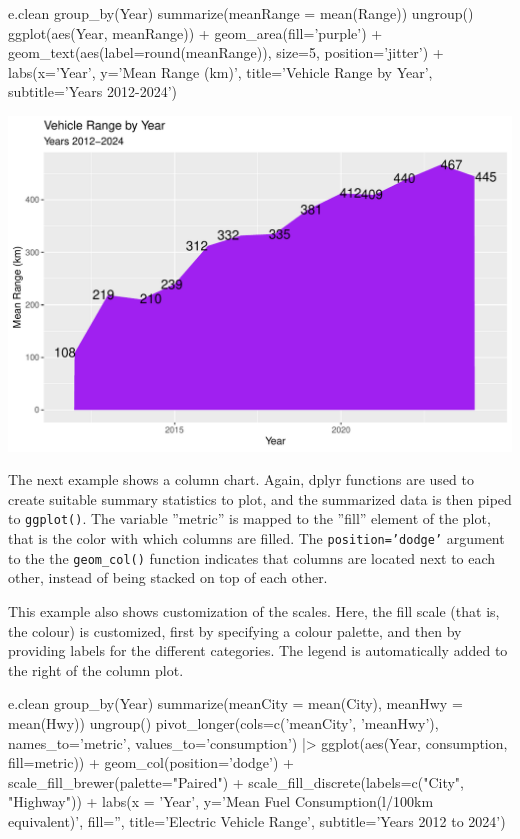 \begin{Rcode}
e.clean %
  group_by(Year) %
  summarize(meanRange = mean(Range)) %
  ungroup() %
  ggplot(aes(Year, meanRange)) + 
    geom_area(fill='purple') +
    geom_text(aes(label=round(meanRange)), 
              size=5, position='jitter') +
    labs(x='Year', y='Mean Range (km)', 
         title='Vehicle Range by Year', 
         subtitle='Years 2012-2024')
\end{Rcode}

\begin{center}
  \includegraphics[width=.8\textwidth]{fuel.areaOneSeries.pdf}
\end{center}

The next example shows a column chart. Again, dplyr functions are used to create suitable summary statistics to plot, and the summarized data is then piped to \texttt{ggplot()}. The variable ''metric'' is mapped to the ''fill'' element of the plot, that is the color with which columns are filled. The \texttt{position='dodge'} argument to the the \texttt{geom\_col()} function indicates that columns are located next to each other, instead of being stacked on top of each other. 

This example also shows customization of the scales. Here, the fill scale (that is, the colour) is customized, first by specifying a colour palette, and then by providing labels for the different categories. The legend is automatically added to the right of the column plot.

\newpage
\begin{Rcode}
e.clean %
   group_by(Year) %
   summarize(meanCity = mean(City), meanHwy = mean(Hwy)) %
   ungroup() %
   pivot_longer(cols=c('meanCity', 'meanHwy'), 
                names_to='metric', 
                values_to='consumption') |>
   ggplot(aes(Year, consumption, fill=metric)) +
      geom_col(position='dodge') +
      scale_fill_brewer(palette="Paired") +
      scale_fill_discrete(labels=c("City", "Highway")) + 
      labs(x = 'Year', 
           y='Mean Fuel Consumption\n(l/100km equivalent)', 
           fill='', 
           title='Electric Vehicle Range', 
           subtitle='Years 2012 to 2024')
\end{Rcode}

